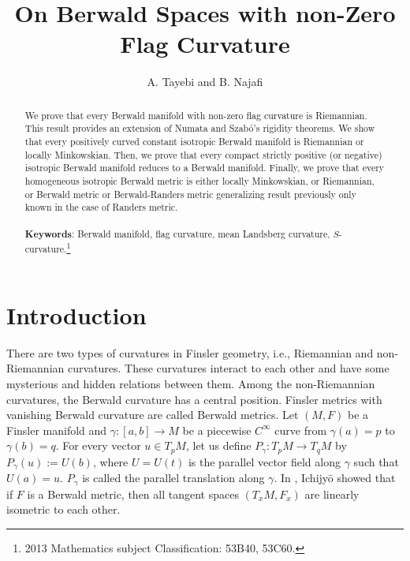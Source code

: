 \documentclass[12pt,a4paper]{article}
\title{On Berwald Spaces with non-Zero Flag Curvature}
\author{A. Tayebi and B. Najafi}
\theoremstyle{definition}
\numberwithin{equation}{section}
\begin{document}
\maketitle
\begin{abstract}
We prove that every Berwald manifold with non-zero flag curvature is Riemannian. This result provides an extension of Numata  and  Szab\'{o}'s rigidity theorems. We show that every positively curved constant isotropic Berwald manifold is Riemannian or locally Minkowskian. Then, we prove that every compact strictly positive (or negative) isotropic Berwald manifold reduces to a Berwald manifold. Finally, we prove that every   homogeneous  isotropic Berwald   metric is  either  locally Minkowskian, or Riemannian, or Berwald metric or Berwald-Randers metric generalizing result previously only known in the case of Randers metric.\\\\
{\bf {Keywords}}:   Berwald manifold, flag curvature, mean Landsberg curvature, $S$-curvature.\footnote{ 2013 Mathematics subject Classification: 53B40, 53C60.}
\end{abstract}

\section{Introduction}
There are two types of curvatures in Finsler  geometry, i.e.,  Riemannian and non-Riemannian curvatures. These curvatures interact to each other and have some mysterious and hidden  relations between them. Among the non-Riemannian curvatures, the Berwald curvature has a central position. Finsler metrics with vanishing Berwald curvature are called Berwald metrics. Let  $(M, F)$ be  a Finsler manifold and $\gamma: [a, b]\rightarrow M$ be a piecewise $C^\infty$ curve from $\gamma(a)=p$ to $\gamma(b)=q$. For every vector $u\in T_pM$, let us define $P_\gamma:T_pM\rightarrow T_qM$ by $P_\gamma(u):=U(b)$, where $U=U(t)$ is the parallel vector field along $\gamma$ such that $U(a)=u$. $P_\gamma$ is called the parallel translation along $\gamma$. In \cite{I},  Ichijy\={o} showed that if  $F$ is a Berwald metric, then  all tangent spaces $(T_xM, F_x)$ are linearly isometric to each other.
\end{document}
